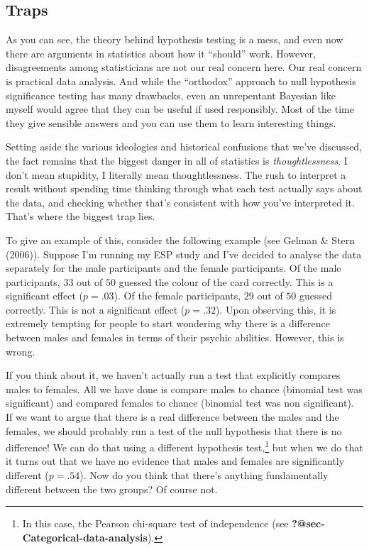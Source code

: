 \documentclass[
  a4paper,
]{book}
\begin{document}
\subsection{Traps}\label{traps}

As you can see, the theory behind hypothesis testing is a mess, and even
now there are arguments in statistics about how it ``should'' work.
However, disagreements among statisticians are not our real concern
here. Our real concern is practical data analysis. And while the
``orthodox'' approach to null hypothesis significance testing has many
drawbacks, even an unrepentant Bayesian like myself would agree that
they can be useful if used responsibly. Most of the time they give
sensible answers and you can use them to learn interesting things.

Setting aside the various ideologies and historical confusions that
we've discussed, the fact remains that the biggest danger in all of
statistics is \emph{thoughtlessness}. I don't mean stupidity, I
literally mean thoughtlessness. The rush to interpret a result without
spending time thinking through what each test actually says about the
data, and checking whether that's consistent with how you've interpreted
it. That's where the biggest trap lies.

To give an example of this, consider the following example (see Gelman
\& Stern (2006)). Suppose I'm running my ESP study and I've decided to
analyse the data separately for the male participants and the female
participants. Of the male participants, \(33\) out of \(50\) guessed the
colour of the card correctly. This is a significant effect
(\(p = .03\)). Of the female participants, \(29\) out of \(50\) guessed
correctly. This is not a significant effect (\(p = .32\)). Upon
observing this, it is extremely tempting for people to start wondering
why there is a difference between males and females in terms of their
psychic abilities. However, this is wrong.

If you think about it, we haven't actually run a test that explicitly
compares males to females. All we have done is compare males to chance
(binomial test was significant) and compared females to chance (binomial
test was non significant). If we want to argue that there is a real
difference between the males and the females, we should probably run a
test of the null hypothesis that there is no difference! We can do that
using a different hypothesis test,\footnote{In this case, the Pearson
  chi-square test of independence (see
  \textbf{?@sec-Categorical-data-analysis}).} but when we do that it
turns out that we have no evidence that males and females are
significantly different (\(p = .54\)). Now do you think that there's
anything fundamentally different between the two groups? Of course not.
\end{document}
